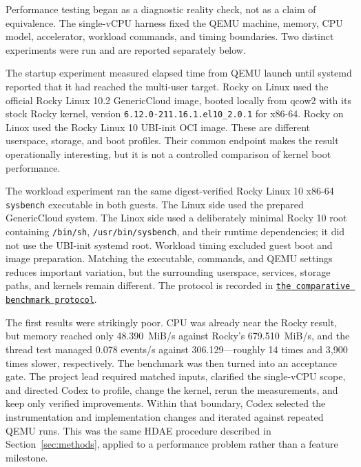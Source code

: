 \documentclass[11pt]{article}
\newcommand{\repolink}[2]{\href{https://github.com/gmkurtzer/ginux/blob/d11c126a048a51fe7eb9c4105f31760add1027ea/#1}{\texttt{#2}}}
\begin{document}
Performance testing began as a diagnostic reality check, not as a claim of
equivalence. The single-vCPU harness fixed the QEMU machine, memory, CPU model,
accelerator, workload commands, and timing boundaries. Two distinct experiments
were run and are reported separately below.

The startup experiment measured elapsed time from QEMU launch until systemd
reported that it had reached the multi-user target. Rocky on Linux used the official Rocky
Linux 10.2 GenericCloud image, booted locally from qcow2 with its stock Rocky
kernel, version \texttt{6.12.0-211.16.1.el10\_2.0.1} for x86-64. Rocky on Linox used the
Rocky Linux 10 UBI-init OCI image. These are different userspace, storage, and
boot profiles. Their common endpoint makes the result operationally
interesting, but it is not a controlled comparison of kernel boot performance.

The workload experiment ran the same digest-verified Rocky Linux 10 x86-64
\texttt{sysbench} executable in both guests. The Linux side used the prepared
GenericCloud system. The Linox side used a deliberately minimal Rocky 10 root
containing \texttt{/bin/sh}, \texttt{/usr/bin/sysbench}, and their runtime
dependencies; it did not use the UBI-init systemd root. Workload timing excluded
guest boot and image preparation. Matching the executable, commands, and QEMU
settings reduces important variation, but the surrounding userspace, services,
storage paths, and kernels remain different. The protocol is recorded in
\repolink{docs/BENCHMARKING.md}{the comparative benchmark protocol}.

The first results were strikingly poor. CPU was already near the Rocky result,
but memory reached only 48.390~MiB/s
against Rocky's 679.510~MiB/s, and the thread test managed 0.078 events/s
against 306.129---roughly 14 times and 3,900 times slower, respectively. The
benchmark was then turned into an acceptance gate. The project lead required
matched inputs, clarified the single-vCPU scope, and directed Codex to profile,
change the kernel, rerun the measurements, and keep only verified
improvements. Within that boundary, Codex selected the instrumentation and
implementation changes and iterated against repeated QEMU runs. This was the
same HDAE procedure described in
Section~\ref{sec:methods}, applied to a performance problem rather than a
feature milestone.
\end{document}
